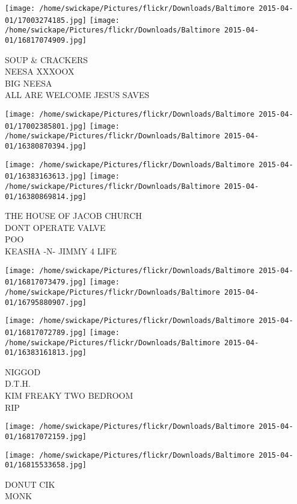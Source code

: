 \documentclass[10pt,letterpaper]{article}
\begin{document}
\texttt{[image: /home/swickape/Pictures/flickr/Downloads/Baltimore 2015-04-01/17003274185.jpg]}
\texttt{[image: /home/swickape/Pictures/flickr/Downloads/Baltimore 2015-04-01/16817074909.jpg]}

SOUP \& CRACKERS\\
NEESA XXXOOX\\
BIG NEESA\\
ALL ARE WELCOME JESUS SAVES\\
\pagebreak

\texttt{[image: /home/swickape/Pictures/flickr/Downloads/Baltimore 2015-04-01/17002385801.jpg]}
\texttt{[image: /home/swickape/Pictures/flickr/Downloads/Baltimore 2015-04-01/16380870394.jpg]}

\texttt{[image: /home/swickape/Pictures/flickr/Downloads/Baltimore 2015-04-01/16383163613.jpg]}
\texttt{[image: /home/swickape/Pictures/flickr/Downloads/Baltimore 2015-04-01/16380869814.jpg]}

THE HOUSE OF JACOB CHURCH\\
DONT OPERATE VALVE\\
POO\\
KEASHA {-}N{-} JIMMY 4 LIFE\\
\pagebreak

\texttt{[image: /home/swickape/Pictures/flickr/Downloads/Baltimore 2015-04-01/16817073479.jpg]}
\texttt{[image: /home/swickape/Pictures/flickr/Downloads/Baltimore 2015-04-01/16795880907.jpg]}

\texttt{[image: /home/swickape/Pictures/flickr/Downloads/Baltimore 2015-04-01/16817072789.jpg]}
\texttt{[image: /home/swickape/Pictures/flickr/Downloads/Baltimore 2015-04-01/16383161813.jpg]}

NIGGOD\\
D.T.H.\\
KIM FREAKY TWO BEDROOM\\
RIP\\
\pagebreak

\texttt{[image: /home/swickape/Pictures/flickr/Downloads/Baltimore 2015-04-01/16817072159.jpg]}

\vspace{0.25in}
\texttt{[image: /home/swickape/Pictures/flickr/Downloads/Baltimore 2015-04-01/16815533658.jpg]}

DONUT CIK\\
MONK\\
\pagebreak
\end{document}
